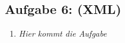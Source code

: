 \subsection{Aufgabe 6: (XML)}
\label{sec:Aufgabe6}
\begin{enumerate}[label=\alph*)]
    \item \textit{Hier kommt die Aufgabe}
\end{enumerate}
